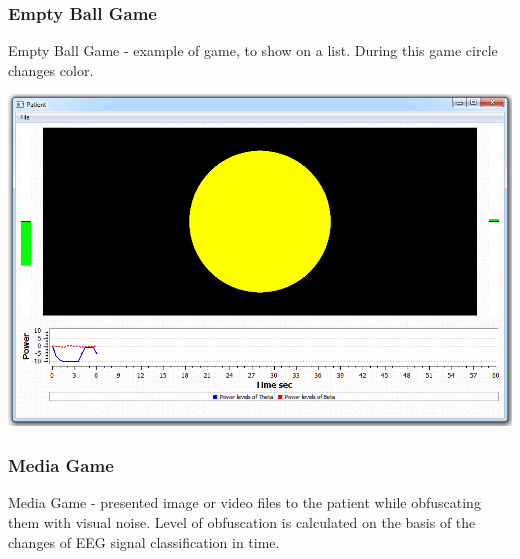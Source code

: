 \documentclass[letterpaper,10pt,english]{sphinxmanual}
\begin{document}
\subsubsection{Empty Ball Game}
\label{index:empty-ball-game}
Empty Ball Game - example of game, to show on a list. During this game circle changes color.

{\hfill\includegraphics{EmptyBallGame.PNG}\hfill}


\subsubsection{Media Game}
\label{index:media-game}
Media Game - presented image or video files to the patient while obfuscating them with visual noise. Level of obfuscation is calculated on the basis of the changes of EEG signal classification in time.
\end{document}
